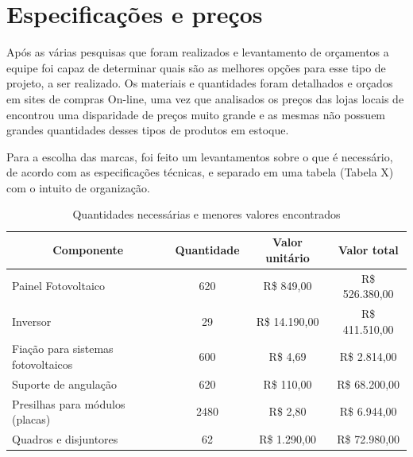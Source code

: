 
\section{Especificações e preços}
Após as várias pesquisas que foram realizados e levantamento de orçamentos a equipe foi capaz de determinar quais são as melhores opções para esse tipo de projeto, a ser realizado. Os materiais e quantidades foram detalhados e orçados em sites de compras On-line, uma vez que analisados os preços das lojas locais de encontrou uma disparidade de preços muito grande e as mesmas não possuem grandes quantidades desses tipos de produtos em estoque.

\par Para a escolha das marcas, foi feito um levantamentos sobre o que é necessário, de acordo com as especificações técnicas, e separado em uma tabela (Tabela X) com o intuito de organização.

\begin{table}[]
\centering
\caption{Quantidades necessárias e menores valores encontrados}
\begin{tabular}{|l|c|c|c|}
\hline
\multicolumn{1}{|c|}{\textbf{Componente}} & \textbf{Quantidade} & \textbf{Valor unitário} & \textbf{Valor total} \\ \hline
Painel Fotovoltaico                       & 620                 & R\$ 849,00              & R\$ 526.380,00       \\ \hline
Inversor                                  & 29                  & R\$ 14.190,00           & R\$ 411.510,00       \\ \hline
Fiação para sistemas fotovoltaicos        & 600                 & R\$ 4,69                & R\$ 2.814,00         \\ \hline
Suporte de angulação                      & 620                 & R\$ 110,00              & R\$ 68.200,00        \\ \hline
Presilhas para módulos (placas)           & 2480                & R\$ 2,80                & R\$ 6.944,00         \\ \hline
Quadros e disjuntores                     & 62                  & R\$ 1.290,00            & R\$ 72.980,00        \\ \hline
\end{tabular}
\end{table}

